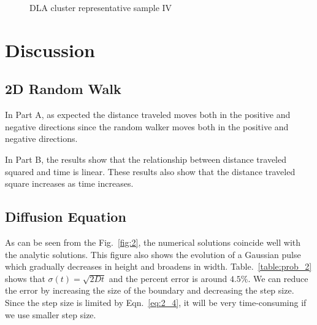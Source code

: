 \documentclass[notitlepage,aps,prd,nofootinbib]{revtex4-1}
\begin{document}
\begin{figure}[!h]
\centering
{}
\caption{DLA cluster representative sample IV}
\label{dla4}
\end{figure}


\clearpage
\section{Discussion}
\label{sec:Conclusions}
\subsection{2D Random Walk}
In Part A, as expected the distance traveled moves both in the positive and negative directions since the random walker moves both in the positive and negative directions.

In Part B, the results show that the relationship between distance traveled squared and time is linear. These results also show that the distance traveled square increases as time increases.

\subsection{Diffusion Equation}
As can be seen from the Fig.~\eqref{fig:2}, the numerical solutions coincide well with the analytic solutions. This figure also shows the evolution of a Gaussian pulse which gradually decreases in height and broadens in width. Table.~\eqref{table:prob_2} shows that $\sigma(t) = \sqrt{2Dt}$ and the percent error is around $4.5\%$. We can reduce the error by increasing the size of the boundary and decreasing the step size. Since the step size is limited by Eqn.~\eqref{eq:2_4}, it will be very time-consuming if we use smaller step size. 
\end{document}
